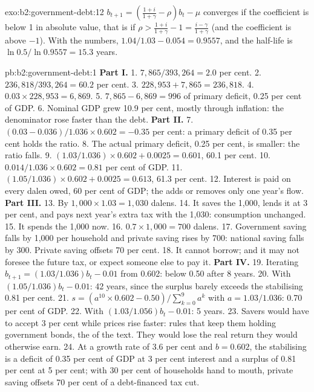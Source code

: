 \begin{solution}{exo:b2:government-debt:12}
$b_{t+1} = \left(\frac{1 + i}{1 + \gamma} - \rho\right)b_t - \mu$ converges if the coefficient is below 1 in absolute value, that is if $\rho > \frac{1 + i}{1 + \gamma} - 1 = \frac{i - \gamma}{1 + \gamma}$ (and the coefficient is above $-1$). With the numbers,
$1.04/1.03 - 0.054 = 0.9557$, and the half-life is $\ln 0.5/\ln 0.9557 = 15.3$ years.
\end{solution}

\begin{solution}{pb:b2:government-debt:1}
\textbf{Part I.}
1. $7{,}865/393{,}264 = 2.0$ per cent.
2. $236{,}818/393{,}264 = 60.2$ per cent.
3. $228{,}953 + 7{,}865 = 236{,}818$.
4. $0.03 \times 228{,}953 = 6{,}869$.
5. $7{,}865 - 6{,}869 = 996$ of primary deficit, 0.25 per cent of GDP.
6. Nominal GDP grew 10.9 per cent, mostly through inflation: the denominator rose faster than the debt.
\textbf{Part II.}
7. $(0.03 - 0.036)/1.036 \times 0.602 = -0.35$ per cent: a primary deficit of 0.35 per cent holds the ratio.
8. The actual primary deficit, 0.25 per cent, is smaller: the ratio falls.
9. $(1.03/1.036) \times 0.602 + 0.0025 = 0.601$, 60.1 per cent.
10. $0.014/1.036 \times 0.602 = 0.81$ per cent of GDP.
11. $(1.05/1.036) \times 0.602 + 0.0025 = 0.613$, 61.3 per cent.
12. Interest is paid on every dalen owed, 60 per cent of GDP; the  adds or removes only one year's flow.
\textbf{Part III.}
13. By $1{,}000 \times 1.03 = 1{,}030$ dalens.
14. It saves the 1,000, lends it at 3 per cent, and pays next year's extra tax with the 1,030: consumption unchanged.
15. It spends the 1,000 now.
16. $0.7 \times 1{,}000 = 700$ dalens.
17. Government saving falls by 1,000 per household and private saving rises by 700: national saving falls by 300. Private saving offsets 70
per cent.
18. It cannot borrow; and it may not foresee the future tax, or expect someone else to pay it.
\textbf{Part IV.}
19. Iterating $b_{t+1} = (1.03/1.036)b_t - 0.01$ from 0.602: below 0.50 after 8 years.
20. With $(1.05/1.036)b_t - 0.01$: 42 years, since the surplus barely exceeds the stabilising 0.81 per cent.
21. $s = \left(a^{10} \times 0.602 - 0.50\right)/\sum_{k=0}^{9}a^k$ with $a = 1.03/1.036$: 0.70 per cent of GDP.
22. With $(1.03/1.056)b_t - 0.01$: 5 years.
23. Savers would have to accept 3 per cent while prices rise faster: rules that keep them holding government bonds, the
 of the text. They would lose the real return they would otherwise earn.
24. At a growth rate of 3.6 per cent and $b = 0.602$, the stabilising  is a deficit of 0.35 per cent of GDP at 3 per cent interest and a surplus of 0.81 per cent
at 5 per cent; with 30 per cent of households hand to mouth, private saving offsets 70 per cent of a debt-financed tax cut.
\end{solution}
